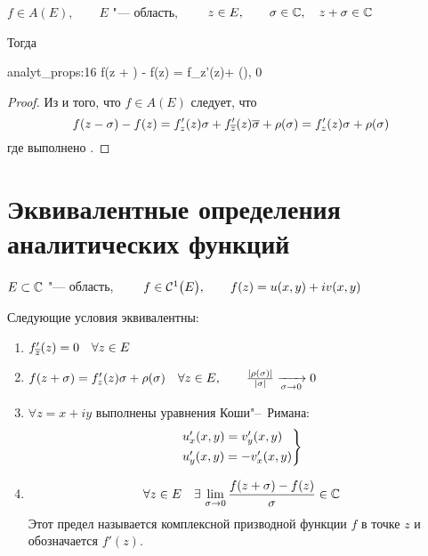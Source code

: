 \begin{statement}
	$ f \in A(E), \qquad E $ "--- область, $ \qquad z \in E, \qquad \sigma \in \Co, \quad z + \sigma \in \Co $

	Тогда
	\begin{equ}{analyt_props:16}
		f(z + \sigma) - f(z) = f_z'(z)\sigma + \rho(\sigma), \qquad \frac{|\rho(\sigma)|}{|\sigma|}  0
	\end{equ}
\end{statement}

\begin{proof}
	Из  и того, что $ f \in A(E) $ следует, что
	$$ f(z - \sigma) - f(z) = f_z'(z)\sigma + f_{\ol z}'(z)\ol \sigma + \rho(\sigma) = f_z'(z)\sigma + \rho(\sigma) $$
	где выполнено .
\end{proof}

\section{Эквивалентные определения аналитических функций}

\begin{theorem}
	$ E \sub \Co $ "--- область, $ \qquad f \in \Cont[1] E, \qquad f(z) = u(x, y) + iv(x, y) $

	Следующие условия эквивалентны:
	\begin{enumerate}
		\item $ f_{\ol z}'(z) = 0 \quad \forall z \in E $
		\item $ f(z + \sigma) = f_z'(z)\sigma + \rho(\sigma) \quad \forall z \in E, \qquad \frac{|\rho(\sigma)|}{|\sigma|} \underarr{\sigma \to 0} 0 $
		\item $ \forall z = x + iy $ выполнены уравнения Коши"--~Римана:
		$$
		\begin{rcases}
			u_x'(x, y) = v_y'(x, y) \\
			u_y'(x, y) = -v_x'(x, y)
		\end{rcases} $$
		\item
		$$ \forall z \in E \quad \exist \limz\sigma \frac{f(z + \sigma) - f(z)}\sigma \in \Co $$
		Этот предел называется комплексной призводной функции $ f $ в точке $ z $ и обозначается $ f'(z) $.
	\end{enumerate}
\end{theorem}

